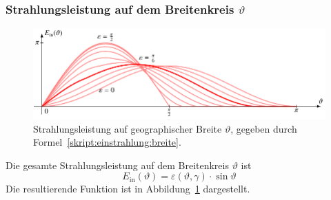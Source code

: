 \subsubsection{Strahlungsleistung auf dem Breitenkreis $\vartheta$}
\begin{figure}
\centering
\includegraphics[width=\hsize]{chapters/5/ein1.pdf}
\caption{Strahlungsleistung auf geographischer Breite $\vartheta$,
gegeben durch Formel~\eqref{skript:einstrahlung:breite}.
\label{skript:einstrahlung:ein1}}
\end{figure}%
Die gesamte Strahlungsleistung auf dem Breitenkreis $\vartheta$
ist
\begin{equation}
E_{\text{in}}(\vartheta)
=
\varepsilon(\vartheta,\gamma)
\cdot
\sin\vartheta
\label{skript:einstrahlung:breite}
\end{equation}
Die resultierende Funktion ist in Abbildung~\ref{skript:einstrahlung:ein1}
dargestellt.












